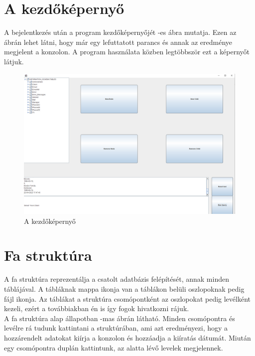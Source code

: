 \section{A kezdőképernyő}	A bejelentkezés után a program kezdőképernyőjét -es ábra mutatja. Ezen az ábrán lehet látni, hogy már egy lefuttatott parancs és annak az eredménye megjelent a konzolon. A program használata közben legtöbbször ezt a képernyőt látjuk.

\begin{figure} [H]
	\centering
	\includegraphics[width=.9\textwidth]{images/opening_screen.png}
	\caption{A kezdőképernyő}
	\label{fig:program}
\end{figure}

\section{Fa struktúra} A fa struktúra reprezentálja a csatolt adatbázis felépítését, annak minden táblájával. A tábláknak mappa ikonja van a táblákon belüli oszlopoknak pedig fájl ikonja. Az táblákat a struktúra csomópontként az oszlopokat pedig levélként kezeli, ezért a továbbiakban én is így fogok hivatkozni rájuk.\\

A fa struktúra alap állapotban -mas ábrán látható. Minden csomópontra és levélre rá tudunk kattintani a struktúrában, ami azt eredményezi, hogy a hozzárendelt adatokat kiírja a konzolon és hozzáadja a kiíratás dátumát. Miután egy csomópontra duplán kattintunk, az alatta lévő levelek megjelennek.

